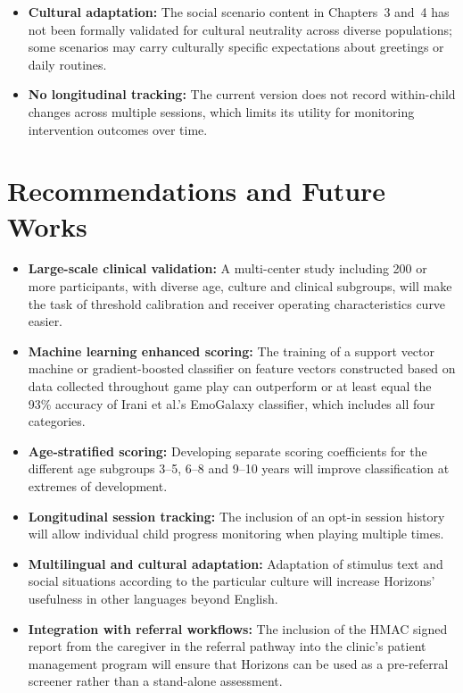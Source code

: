 \documentclass[12pt,a4paper,oneside]{report}
\begin{document}
	\begin{itemize}[leftmargin=0.5in]
		\item \textbf{Cultural adaptation:} The social scenario content in Chapters~3 and~4 has not been formally validated for cultural neutrality across diverse populations; some scenarios may carry culturally specific expectations about greetings or daily routines.
		
		\item \textbf{No longitudinal tracking:} The current version does not record within-child changes across multiple sessions, which limits its utility for monitoring intervention outcomes over time.
	\end{itemize}
	
	\section{Recommendations and Future Works}
	
	\begin{itemize}[leftmargin=0.5in]
		\item \textbf{Large-scale clinical validation:} A multi-center study including 200 or more participants, with diverse age, culture and clinical subgroups, will make the task of threshold calibration and receiver operating characteristics curve easier.
		
		\item \textbf{Machine learning enhanced scoring:} The training of a support vector machine or gradient-boosted classifier on feature vectors constructed based on data collected throughout game play can outperform or at least equal the 93\% accuracy of Irani et al.'s EmoGalaxy classifier, which includes all four categories.
		
		\item \textbf{Age-stratified scoring:} Developing separate scoring coefficients for the different age subgroups 3–5, 6–8 and 9–10 years will improve classification at extremes of development.
		
		\item \textbf{Longitudinal session tracking:} The inclusion of an opt-in session history will allow individual child progress monitoring when playing multiple times.
		
		\item \textbf{Multilingual and cultural adaptation:} Adaptation of stimulus text and social situations according to the particular culture will increase Horizons' usefulness in other languages beyond English.
		
		\item \textbf{Integration with referral workflows:} The inclusion of the HMAC signed report from the caregiver in the referral pathway into the clinic's patient management program will ensure that Horizons can be used as a pre-referral screener rather than a stand-alone assessment.
	\end{itemize}
	
\end{document}
